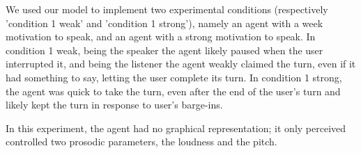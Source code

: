 We used our model to implement two experimental conditions (respectively 'condition 1 weak' and 'condition 1 strong'), namely an agent with a week motivation to speak, and an agent with a strong motivation to speak.  
In condition 1 weak, being the speaker the agent likely paused when the user interrupted it, and being the listener the agent weakly claimed the turn, even if it had something to say, letting the user complete its turn. In condition 1 strong, the agent was quick to take the turn, even after the end of the user's turn and likely kept the turn in response to user's barge-ins. 

In this experiment, the agent had no graphical representation; it only perceived controlled two prosodic parameters, the loudness and the pitch. 
 

